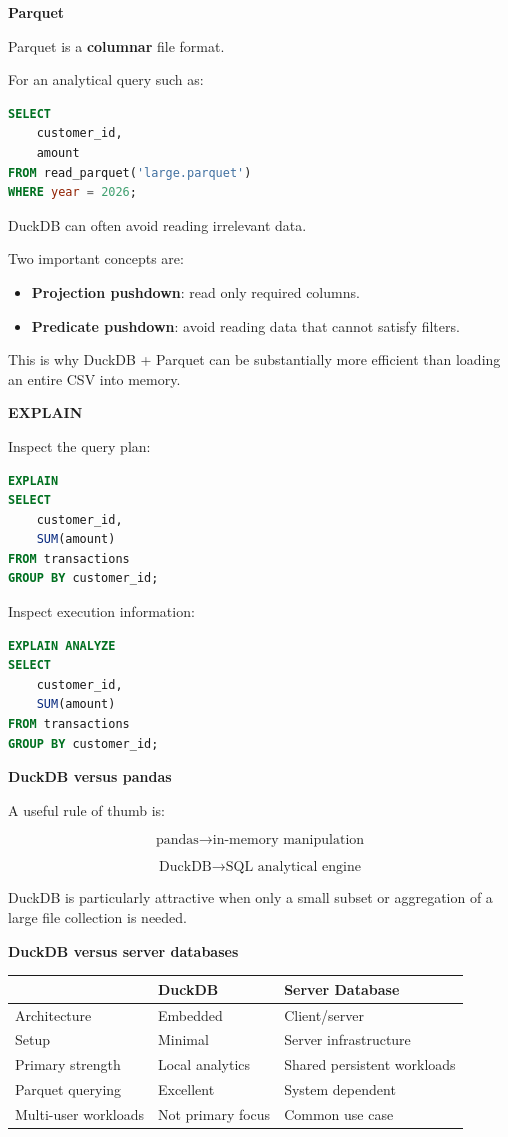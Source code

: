 \documentclass[11pt,letterpaper]{article}
\begin{document}
\textbf{Parquet}

Parquet is a \textbf{columnar} file format.

For an analytical query such as:

\begin{lstlisting}[language=SQL]
SELECT
    customer_id,
    amount
FROM read_parquet('large.parquet')
WHERE year = 2026;
\end{lstlisting}

DuckDB can often avoid reading irrelevant data.

Two important concepts are:

\begin{itemize}[leftmargin=*]
    \item \textbf{Projection pushdown}: read only required columns.
    \item \textbf{Predicate pushdown}: avoid reading data that cannot satisfy filters.
\end{itemize}

This is why DuckDB + Parquet can be substantially more efficient than loading
an entire CSV into memory.

\textbf{EXPLAIN}

Inspect the query plan:

\begin{lstlisting}[language=SQL]
EXPLAIN
SELECT
    customer_id,
    SUM(amount)
FROM transactions
GROUP BY customer_id;
\end{lstlisting}

Inspect execution information:

\begin{lstlisting}[language=SQL]
EXPLAIN ANALYZE
SELECT
    customer_id,
    SUM(amount)
FROM transactions
GROUP BY customer_id;
\end{lstlisting}

\textbf{DuckDB versus pandas}

A useful rule of thumb is:

\[
\text{pandas}
\rightarrow
\text{in-memory manipulation}
\]

\[
\text{DuckDB}
\rightarrow
\text{SQL analytical engine}
\]

DuckDB is particularly attractive when only a small subset or aggregation of
a large file collection is needed.

\textbf{DuckDB versus server databases}

\begin{center}
\begin{tabularx}{\textwidth}{lXX}
\toprule
 & DuckDB & Server Database \\
\midrule
Architecture & Embedded & Client/server \\
Setup & Minimal & Server infrastructure \\
Primary strength & Local analytics & Shared persistent workloads \\
Parquet querying & Excellent & System dependent \\
Multi-user workloads & Not primary focus & Common use case \\
\bottomrule
\end{tabularx}
\end{center}
\end{document}
